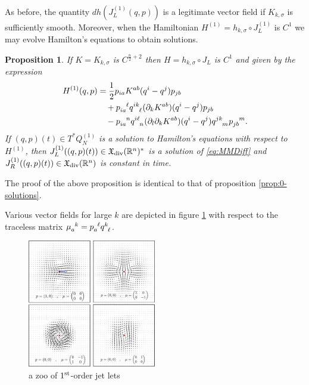 \documentclass[12pt]{amsart}
\newcommand{\R}{\ensuremath{\mathbb{R}}}
\newtheorem{prop}[thm]{Proposition}
\begin{document}
  As before, the quantity $dh( J_L^{(1)}(q,p))$ is a legitimate vector field
  if $K_{k,\sigma}$ is sufficiently smooth.  Moreover, when the Hamiltonian
  $H^{(1)} = h_{k,\sigma} \circ J_L^{(1)}$ is $C^1$ we may evolve Hamilton's equations
  to obtain solutions.
  
  \begin{prop} \label{prop:1-solutions}
  	If $K = K_{k,\sigma}$ is $C^{\frac{n}{2} + 2}$ then
        $H = h_{k,\sigma} \circ J_L$
	is $C^1$ and given by the expression
	\begin{align*}
		H^{(1)}(q,p) &= \frac{1}{2} p_{ia} K^{ab}(q^i - q^j) p_{jb}\\
			&\quad + p\indices{_{ia}^\ell} q\indices{^{ik}_\ell} (\partial_k K^{ab})(q^i - q^j) p_{jb} \\
			&\quad - p\indices{_{ia}^n} q\indices{^{i\ell}_n} (\partial_l \partial_k K^{ab})(q^i - q^j) q\indices{^{jk}_m}  p\indices{_{jb}^m}.
  \end{align*}
  If $(q,p)(t) \in T^*Q_N^{(1)}$ is a solution to Hamilton's equations with respect to
	$H^{(1)}$, then $J_L^{(1)}( (q,p)(t)) \in \mathfrak{X}_{\rm div}(\R^n)^*$ is
	a solution of \eqref{eq:MMDiff} and $J_R^{(1)}( (q,p)(t)) \in \mathfrak{X}_{\rm div}(\R^n)$ is
	constant in time. 
  \end{prop}
  The proof of the above proposition is identical to that of proposition \ref{prop:0-solutions}.
  
  Various vector fields for large $k$
  are depicted in figure \ref{fig:zoo}
  with respect to the traceless matrix $\mu\indices{_a^k} = p\indices{_a^\ell} q\indices{^k_\ell}$.
  
  \begin{figure}
  	\centering
	\includegraphics[width=0.5\textwidth]{./images/zoo}
	\caption{a zoo of $1^{\rm st}$-order jet lets}
	\label{fig:zoo}
  \end{figure}
\end{document}
